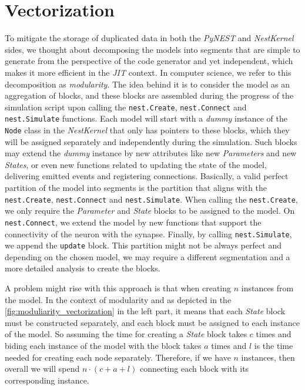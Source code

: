 \chapter{Vectorization}
 \label{chap:vec}
 
 To mitigate the storage of duplicated data in both the \emph{PyNEST} and \emph{NestKernel} sides, we thought about decomposing the models into segments that are simple to generate from the perspective of the code generator and yet independent, which makes it more efficient in the \emph{JIT} context. In computer science, we refer to this decomposition as \emph{modularity}. The idea behind it is to consider the model as an aggregation of blocks, and these blocks are assembled during the progress of the simulation script upon calling the \texttt{nest.Create}, \texttt{nest.Connect} and \texttt{nest.Simulate} functions. Each model will start with a \emph{dummy} instance of the \texttt{Node} class in the \emph{NestKernel} that only has pointers to these blocks, which they will be assigned  separately and independently during the simulation. Such blocks may extend the \emph{dummy} instance by new attributes like new \emph{Parameters} and new \emph{States}, or even new functions related to updating the state of the model, delivering emitted events and registering connections. Basically, a valid perfect partition of the model into segments is the partition that aligns with the \texttt{nest.Create}, \texttt{nest.Connect} and \texttt{nest.Simulate}. When calling the \texttt{nest.Create}, we only require the \emph{Parameter} and \emph{State} blocks to be assigned to the model. On \texttt{nest.Connect}, we extend the model by new functions that support the connectivity of the neuron with the synapse. Finally, by calling \texttt{nest.Simulate}, we append the \texttt{update} block. This partition might not be always perfect and depending on the chosen model, we may require a different segmentation and a more detailed analysis to create the blocks. 


A problem might rise with this approach is that when creating $n$ instances from the model. In the context of modularity and as depicted in the \autoref{fig:moduliarity_vectorization} in the left part, it means that each \emph{State} block must be constructed separately, and each block must be assigned to each instance of the model. So assuming the time for creating a \emph{State} block takes $c$ times and biding each instance of the model with the block takes $a$ times and $l$ is the time needed for creating each node separately. Therefore, if we have $n$ instances, then overall we will spend $n \cdot (c + a + l)$ connecting each block with its corresponding instance. 

